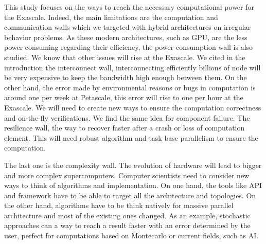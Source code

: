 This study focuses on the ways to reach the necessary computational power for the Exascale. 
Indeed, the main limitations are the computation and communication walls which we targeted with hybrid architectures on irregular behavior problems. 
As these modern architectures, such as GPU, are the less power consuming regarding their efficiency, the power consumption wall is also studied. 
We know that other issues will rise at the Exascale. 
We cited in the introduction the interconnect wall, interconnecting efficiently billions of node will be very expensive to keep the bandwidth high enough between them.
On the other hand, the error made by environmental reasons or bugs in computation is around one per week at Petascale, this error will rise to one per hour at the Exascale. 
We will need to create new ways to ensure the computation correctness and on-the-fly verifications.
We find the same idea for component failure.
The resilience wall, the way to recover faster after a crash or loss of computation element.
This will need robust algorithm and task base parallelism to ensure the computation.

The last one is the complexity wall.
The evolution of hardware will lead to bigger and more complex supercomputers. 
Computer scientists need to consider new ways to think of algorithms and implementation. 
On one hand, the tools like API and framework have to be able to target all the architecture and topologies.
On the other hand, algorithms have to be think natively for massive parallel architecture and most of the existing ones changed.
As an example, stochastic approaches can a way to reach a result faster with an error determined by the user, perfect for computations based on Montecarlo or current fields, such as AI. 
